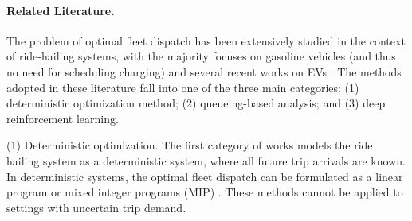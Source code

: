 \paragraph{Related Literature.} The problem of optimal fleet dispatch has been extensively studied in the context of ride-hailing systems, with the majority focuses on gasoline vehicles (and thus no need for scheduling charging) and several recent works on EVs \citep{varma2023electric, roberti2016electric, luke2021joint, boewing2020vehicle, zalesak2021real, shi2019operating, kullman2022, dean2022synergies, yu2023coordinating, singh2024dispatching, dong2022dynamic, su2024branch, ahadi2023cooperative, liu2022smart, chen2023electric, gao2024stochastic, li2024bm, ma2023prolific, li2024coordinating, zhu2023dynamic, provoost2022improving, al2020approximate, iacobucci2019optimization, la2019heuristics, turan2020dynamic, wang2022multi, song2022sumo}. The methods adopted in these literature fall into one of the three main categories: (1) deterministic optimization method; (2) queueing-based analysis; and (3) deep reinforcement learning. 

\medskip 
\noindent(1) Deterministic optimization. The first category of works models the ride hailing system as a deterministic system, where all future trip arrivals are known. In deterministic systems, the optimal fleet dispatch can be formulated as a linear program \citep{luke2021joint} or mixed integer programs (MIP) \citep{zalesak2021real, boewing2020vehicle, dean2022synergies, tuncel2023integrated, yu2023coordinating, su2024branch, chen2023electric, li2024bm, li2024coordinating, provoost2022improving, iacobucci2019optimization}. These methods cannot be applied to settings with uncertain trip demand. 

